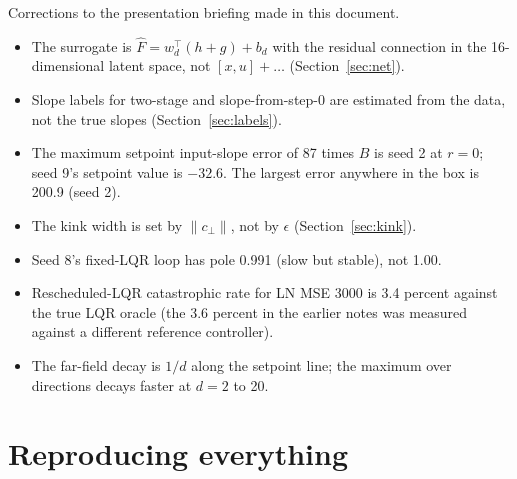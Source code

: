 \documentclass[11pt]{article}
\begin{document}
Corrections to the presentation briefing made in this document.
\begin{itemize}
\item The surrogate is $\hat F=w_d^\top(h+g)+b_d$ with the residual connection in the 16-dimensional latent space, not $[x,u]+\dots$ (Section~\ref{sec:net}).
\item Slope labels for two-stage and slope-from-step-0 are estimated from the data, not the true slopes (Section~\ref{sec:labels}).
\item The maximum setpoint input-slope error of 87 times $B$ is seed 2 at $r=0$; seed 9's setpoint value is $-32.6$. The largest error anywhere in the box is 200.9 (seed 2).
\item The kink width is set by $\|c_\perp\|$, not by $\epsilon$ (Section~\ref{sec:kink}).
\item Seed 8's fixed-LQR loop has pole 0.991 (slow but stable), not 1.00.
\item Rescheduled-LQR catastrophic rate for LN MSE 3000 is 3.4 percent against the true LQR oracle (the 3.6 percent in the earlier notes was measured against a different reference controller).
\item The far-field decay is $1/d$ along the setpoint line; the maximum over directions decays faster at $d=2$ to 20.
\end{itemize}

\section{Reproducing everything}\label{sec:repro}
\end{document}
